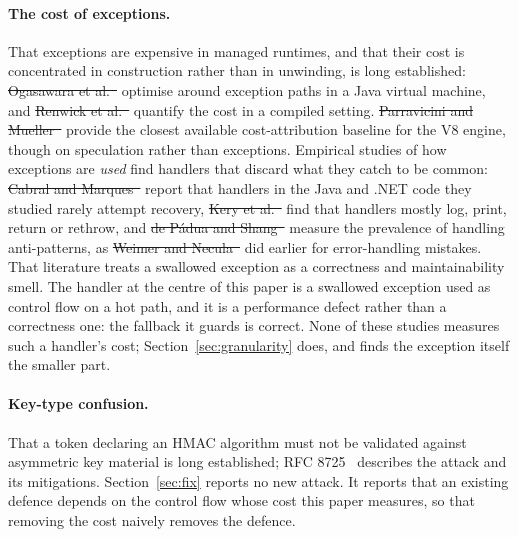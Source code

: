\documentclass[pdflatex,sn-basic,twocolumn]{sn-jnl}%
\providecommand{\DIFdel}[1]{{\protect\color{red}\sout{#1}}}                      %
\providecommand{\DIFaddbegin}{} %
\providecommand{\DIFaddend}{} %
\providecommand{\DIFdelbegin}{} %
\providecommand{\DIFdelend}{} %
\newcommand{\DIFscaledelfig}{0.5}
\newlength{\DIFdelgraphicswidth} %
\newlength{\DIFdelgraphicsheight} %
\newcommand{\DIFaddincludegraphics}[2][]{{\color{blue}\fbox{\DIFOincludegraphics[#1]{#2}}}} %
\newcommand{\DIFdelincludegraphics}[2][]{%
\sbox{\DIFdelgraphicsbox}{\DIFOincludegraphics[#1]{#2}}%
\settoboxwidth{\DIFdelgraphicswidth}{\DIFdelgraphicsbox} %
\settoboxtotalheight{\DIFdelgraphicsheight}{\DIFdelgraphicsbox} %
\scalebox{\DIFscaledelfig}{%
\parbox[b]{\DIFdelgraphicswidth}{\usebox{\DIFdelgraphicsbox}\\[-\baselineskip] \rule{\DIFdelgraphicswidth}{0em}}\llap{\resizebox{\DIFdelgraphicswidth}{\DIFdelgraphicsheight}{%
\setlength{\unitlength}{\DIFdelgraphicswidth}%
\begin{picture}(1,1)%
\thicklines\linethickness{2pt} %
{\color[rgb]{1,0,0}\put(0,0){\framebox(1,1){}}}%
{\color[rgb]{1,0,0}\put(0,0){\line( 1,1){1}}}%
{\color[rgb]{1,0,0}\put(0,1){\line(1,-1){1}}}%
\end{picture}%
}\hspace*{3pt}}} %
} %
\DeclareRobustCommand{\DIFaddbegin}{\DIFOaddbegin \let\includegraphics\DIFaddincludegraphics} %
\DeclareRobustCommand{\DIFaddend}{\DIFOaddend \let\includegraphics\DIFOincludegraphics} %
\DeclareRobustCommand{\DIFdelbegin}{\DIFOdelbegin \let\includegraphics\DIFdelincludegraphics} %
\DeclareRobustCommand{\DIFdelend}{\DIFOaddend \let\includegraphics\DIFOincludegraphics} %
\begin{document}
\paragraph{The cost of exceptions.} That exceptions are expensive in managed
runtimes, and that their cost is concentrated in construction rather than in
unwinding, is long established: \DIFdelbegin \DIFdel{Ogasawara et al.~}%
\DIFdelend \DIFaddbegin \citet{ogasawara2006edo}
\DIFaddend optimise around exception paths in a Java virtual machine, and \DIFdelbegin \DIFdel{Renwick et
al.~}%
\DIFdelend \DIFaddbegin \citet{renwick2019lowcost} \DIFaddend quantify the cost in a compiled setting.
\DIFdelbegin \DIFdel{Parravicini and Mueller~}%
\DIFdelend \DIFaddbegin \citet{parravicini2021cost} \DIFaddend provide the closest
available cost-attribution baseline for the V8 engine, though on speculation
rather than exceptions. Empirical studies of how exceptions are \emph{used}
find handlers that discard what they catch to be common: \DIFdelbegin \DIFdel{Cabral and
Marques~}%
\DIFdelend \DIFaddbegin \citet{cabral2007exception} \DIFaddend report that handlers in the Java and .NET
code they studied rarely attempt recovery, \DIFdelbegin \DIFdel{Kery et
al.~}%
\DIFdelend \DIFaddbegin \citet{kery2016examining} \DIFaddend find that handlers mostly log, print, return or
rethrow, and \DIFdelbegin \DIFdel{de P\'adua and Shang~}%
\DIFdelend \DIFaddbegin \citet{depadua2017prevalence} \DIFaddend measure the
prevalence of handling anti-patterns, as \DIFdelbegin \DIFdel{Weimer and
Necula~}%
\DIFdelend \DIFaddbegin \citet{weimer2004finding} \DIFaddend did earlier for error-handling mistakes. That
literature treats a swallowed exception as a correctness and maintainability
smell. The handler at the centre of this paper is a swallowed exception used as
control flow on a hot path, and it is a performance defect rather than a
correctness one: the fallback it guards is correct. None of these studies
measures such a handler's cost; Section~\ref{sec:granularity} does, and finds
the exception itself the smaller part.

\paragraph{Key-type confusion.} That a token declaring an HMAC algorithm must
not be validated against asymmetric key material is long established; RFC
8725~\DIFdelbegin %
\DIFdelend \DIFaddbegin \citep{rfc8725} \DIFaddend describes the attack and its mitigations.
Section~\ref{sec:fix} reports no new attack. It reports that an existing
defence depends on the control flow whose cost this paper measures, so that
removing the cost naively removes the defence.
\end{document}
